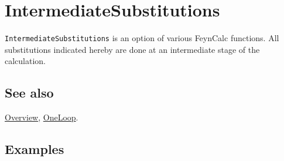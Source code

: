 \documentclass[../FeynCalcManual.tex]{subfiles}
\begin{document}
\hypertarget{intermediatesubstitutions}{
\section{IntermediateSubstitutions}\label{intermediatesubstitutions}}

\texttt{IntermediateSubstitutions} is an option of various FeynCalc
functions. All substitutions indicated hereby are done at an
intermediate stage of the calculation.

\subsection{See also}

\hyperlink{toc}{Overview}, \hyperlink{oneloop}{OneLoop}.

\subsection{Examples}
\end{document}
